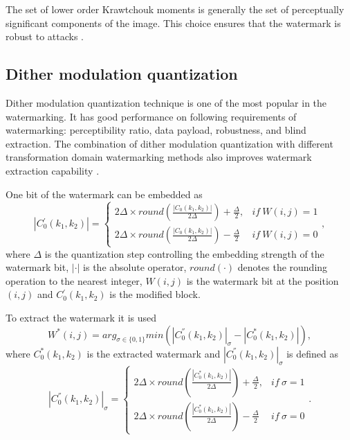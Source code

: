 \documentclass[runningheads]{llncs}
\begin{document}
The set of lower order Krawtchouk moments is generally the set of perceptually significant components of the image. This choice ensures that the watermark is robust to attacks \cite{Yap2004}.

\subsection*{Dither modulation quantization}
Dither modulation quantization technique is one of the most popular in the watermarking. It has good performance on following requirements of watermarking: perceptibility ratio, data payload, robustness, and blind extraction. The combination of dither modulation quantization with different transformation domain watermarking methods also improves watermark extraction capability \cite{chen2001quantization}. 

One bit of the watermark can be embedded as
\begin{equation}
|C{}_{0}^{'}(k_{1},k_{2})|=\begin{cases}
2\Delta\times round(\frac{|C{}_{0}(k_{1},k_{2})|}{2\Delta})+\frac{\Delta}{2}, & if\:W(i,j)=1\\
2\Delta\times round(\frac{|C{}_{0}(k_{1},k_{2})|}{2\Delta})-\frac{\Delta}{2} & if\:W(i,j)=0
\end{cases},
\label{DMEm}
\end{equation}
where $\Delta$ is the quantization step controlling the embedding strength of the watermark bit, $|\cdot|$ is the absolute operator, $round(\cdot)$ denotes the rounding operation to the nearest integer, $W(i,j)$ is the watermark bit at the position $(i,j)$ and $C{}_{0}^{'}(k_{1},k_{2})$ is the modified block.

To extract the watermark it is used
\begin{equation}
W^{*}(i,j)=arg_{\sigma\in\{0,1\}}min(|C_{0}^{''}(k_{1},k_{2})|_{\sigma}-|C_{0}^{*}(k_{1},k_{2})|)
\label{DMEx},
\end{equation}
where $C_{0}^{*}(k_{1},k_{2})$ is the extracted watermark and $|C_{0}^{''}(k_{1},k_{2})|_{\sigma}$ is defined as
\begin{equation}
|C_{0}^{''}(k_{1},k_{2})|_{\sigma}=\begin{cases}
2\Delta\times round(\frac{|C_{0}^{*}(k_{1},k_{2})|}{2\Delta})+\frac{\Delta}{2}, & if\:\sigma=1\\
2\Delta\times round(\frac{|C_{0}^{*}(k_{1},k_{2})|}{2\Delta})-\frac{\Delta}{2} & if\:\sigma=0
\end{cases}.
\end{equation}
\end{document}

